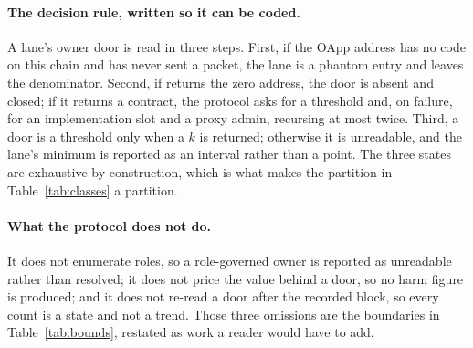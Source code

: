 \documentclass[10pt,a4paper]{article}
\newcommand{\code}[1]{\texttt{\detokenize{#1}}}
\begin{document}
\paragraph{The decision rule, written so it can be coded.}
A lane's owner door is read in three steps. First, if the OApp address has no code on this chain and has
never sent a packet, the lane is a phantom entry and leaves the denominator. Second, if \code{owner()}
returns the zero address, the door is absent and closed; if it returns a contract, the protocol asks for
a threshold and, on failure, for an implementation slot and a proxy admin, recursing at most twice.
Third, a door is a threshold only when a $k$ is returned; otherwise it is unreadable, and the lane's
minimum is reported as an interval rather than a point. The three states are exhaustive by construction,
which is what makes the partition in Table~\ref{tab:classes} a partition.

\paragraph{What the protocol does not do.}
It does not enumerate roles, so a role-governed owner is reported as unreadable rather than resolved; it
does not price the value behind a door, so no harm figure is produced; and it does not re-read a door
after the recorded block, so every count is a state and not a trend. Those three omissions are the
boundaries in Table~\ref{tab:bounds}, restated as work a reader would have to add.
\end{document}
